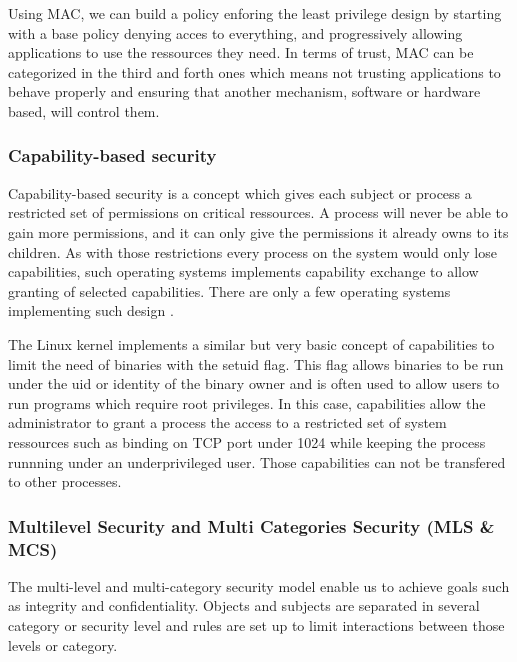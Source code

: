 \documentclass[pdftex,a4paper,titlepage,11pt]{article}
\begin{document}
\bigskip

Using MAC, we can build a policy enforing the least privilege design by
starting with a base policy denying acces to everything, and progressively
allowing applications to use the ressources they need. In terms of trust, MAC
can be categorized in the third and forth ones which means not trusting
applications to behave properly and ensuring that another mechanism, software
or hardware based, will control them.

\subsubsection{Capability-based security}

Capability-based security is a concept which gives each subject or process a
restricted set of permissions on critical ressources. A process will never be
able to gain more permissions, and it can only give the permissions it already
owns to its children. As with those restrictions every process on the
system would only lose capabilities, such operating systems implements
capability exchange to allow granting of selected capabilities. There are only
a few operating systems implementing such design \cite{capabilitycapsicum}.

\bigskip

The Linux kernel implements a similar but very basic concept of capabilities to
limit the need of binaries with the setuid flag. This flag allows binaries to
be run under the uid or identity of the binary owner and is often used to allow
users to run programs which require root privileges. In this case, capabilities
allow the administrator to grant a process the access to a restricted set of
system ressources such as binding on TCP port under 1024 while keeping the
process runnning under an underprivileged user. Those capabilities can not be
transfered to other processes.

\subsubsection{Multilevel Security and Multi Categories Security (MLS \& MCS)}

The multi-level and multi-category security model enable us to achieve goals
such as integrity and confidentiality. Objects and subjects are separated in
several category or security level and rules are set up to limit interactions
between those levels or category.

\bigskip
\end{document}
